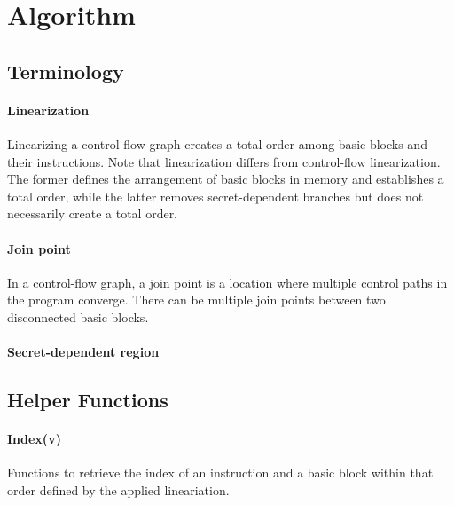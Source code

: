 \documentclass[12pt]{article}
\begin{document}
\section{Algorithm}

\subsection{Terminology}

\paragraph{Linearization}

Linearizing a control-flow graph creates a total order among basic blocks and their instructions.
Note that linearization differs from control-flow linearization.
The former defines the arrangement of basic blocks in memory and establishes a total order, while the latter removes secret-dependent branches but does not necessarily create a total order.

\paragraph{Join point}

In a control-flow graph, a join point is a location where multiple control paths in the program converge.
There can be multiple join points between two disconnected basic blocks.

\paragraph{Secret-dependent region}


\subsection{Helper Functions}

\paragraph{Index(v)}

Functions to retrieve the index of an instruction and a basic block within that order defined by the applied lineariation.
\end{document}
